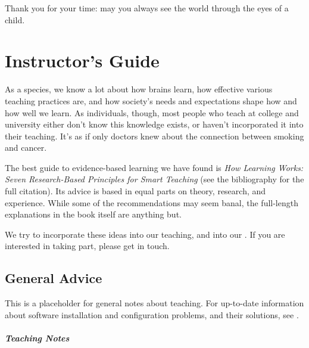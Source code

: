 \documentclass{book}
\begin{document}
Thank you for your time: may you always see the world through the eyes
of a child.

\chapter{Instructor's Guide}\label{s:instructors}

As a species, we know a lot about how brains learn, how effective
various teaching practices are, and how society's needs and expectations
shape how and how well we learn. As individuals, though, most people who
teach at college and university either don't know this knowledge exists,
or haven't incorporated it into their teaching. It's as if only doctors
knew about the connection between smoking and cancer.

The best guide to evidence-based learning we have found is \emph{How
Learning Works: Seven Research-Based Principles for Smart Teaching} (see
the bibliography for the full citation). Its advice is based in equal
parts on theory, research, and experience. While some of the
recommendations may seem banal, the full-length explanations in the book
itself are anything but.

We try to incorporate these ideas into our teaching, and into our
. If you are interested in taking part, please get in touch.

\section{General Advice}

This is a placeholder for general notes about teaching. For up-to-date
information about software installation and configuration problems, and
their solutions, see
.

\mbox{}\paragraph{Teaching Notes}
\end{document}
